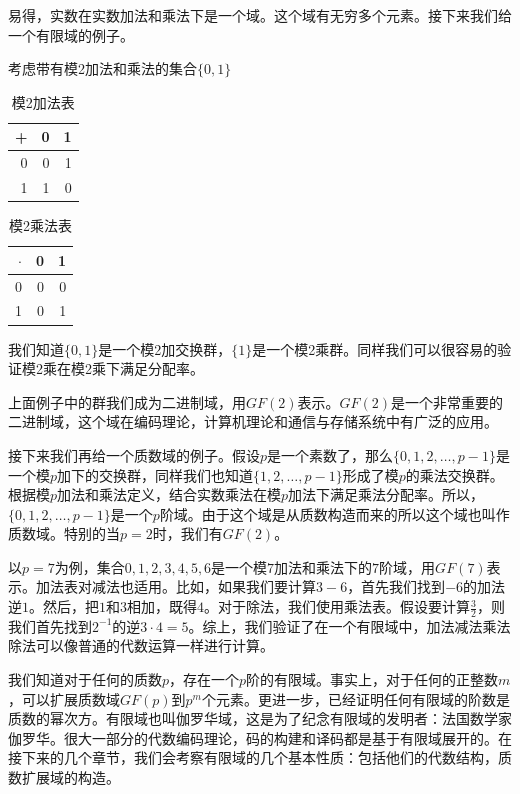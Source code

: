 \documentclass[10pt,a4paper,UTF8]{article}
\begin{document}
易得，实数在实数加法和乘法下是一个域。这个域有无穷多个元素。接下来我们给一个有限域的例子。

考虑带有模2加法和乘法的集合\(\{0,1\}\)
\begin{table}[htbp]
\caption{\label{tab:orgfc1db57}
模2加法表}
\centering
\begin{tabular}{rrr}
+ & 0 & 1\\
\hline
0 & 0 & 1\\
1 & 1 & 0\\
\end{tabular}
\end{table}

\begin{table}[htbp]
\caption{\label{tab:orge53012e}
模2乘法表}
\centering
\begin{tabular}{rrr}
\(\cdot\) & 0 & 1\\
\hline
0 & 0 & 0\\
1 & 0 & 1\\
\end{tabular}
\end{table}

我们知道\(\{0,1\}\)是一个模2加交换群，\(\{1\}\)是一个模2乘群。同样我们可以很容易的验证模2乘在模2乘下满足分配率。

上面例子中的群我们成为二进制域，用\(GF(2)\)表示。\(GF(2)\)是一个非常重要的二进制域，这个域在编码理论，计算机理论和通信与存储系统中有广泛的应用。

接下来我们再给一个质数域的例子。假设\(p\)是一个素数了，那么\(\{0,1,2,\ldots,p-1\}\)是一个模\(p\)加下的交换群，同样我们也知道\(\{1,2,\ldots,p-1\}\)形成了模\(p\)的乘法交换群。根据模\(p\)加法和乘法定义，结合实数乘法在模\(p\)加法下满足乘法分配率。所以，\(\{0,1,2,\ldots,p-1\}\)是一个\(p\)阶域。由于这个域是从质数构造而来的所以这个域也叫作质数域。特别的当\(p=2\)时，我们有\(GF(2)\)。

以\(p=7\)为例，集合\(0,1,2,3,4,5,6\)是一个模\(7\)加法和乘法下的\(7\)阶域，用\(GF(7)\)表示。加法表对减法也适用。比如，如果我们要计算\(3-6\)，首先我们找到\(-6\)的加法逆\(1\)。然后，把\(1\)和\(3\)相加，既得\(4\)。对于除法，我们使用乘法表。假设要计算\(\frac{3}{2}\)，则我们首先找到\(2^{-1}\)的逆\(3\cdot 4 = 5\)。综上，我们验证了在一个有限域中，加法减法乘法除法可以像普通的代数运算一样进行计算。

我们知道对于任何的质数\(p\)，存在一个\(p\)阶的有限域。事实上，对于任何的正整数\(m\)，可以扩展质数域\(GF(p)\)到\(p^{m}\)个元素。更进一步，已经证明任何有限域的阶数是质数的幂次方。有限域也叫伽罗华域，这是为了纪念有限域的发明者：法国数学家伽罗华。很大一部分的代数编码理论，码的构建和译码都是基于有限域展开的。在接下来的几个章节，我们会考察有限域的几个基本性质：包括他们的代数结构，质数扩展域的构造。
\end{document}
